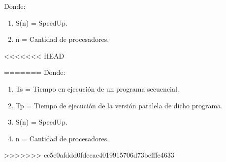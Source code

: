 \begin{table}[h!]
{\begin{enumerate}
{\begin{center}
                            \end{center}            
                            Donde:            
                            \vskip 0.3cm
                            \begin{enumerate}
                                \item[]{S(n) = SpeedUp.}
                                \item[]{n = Cantidad de procesadores.}
                            \end{enumerate}\par
                        }
                    \end{enumerate}\par                 
                              
                }\par                 
            \end{table}
<<<<<<< HEAD
                    
        \newpage
=======
            Donde:
            \vskip 0.3cm
            \begin{enumerate}
                \item[]{Ts = Tiempo en ejecución de un programa secuencial.}
                \item[]{Tp = Tiempo de ejecución de la versión paralela de dicho programa.}
                \item[]{S(n) = SpeedUp.}
                \item[]{n = Cantidad de procesadores.}
            \end{enumerate}\par

\newpage

>>>>>>> cc5e0afddd0fdecae4019915706d73befffe4633
